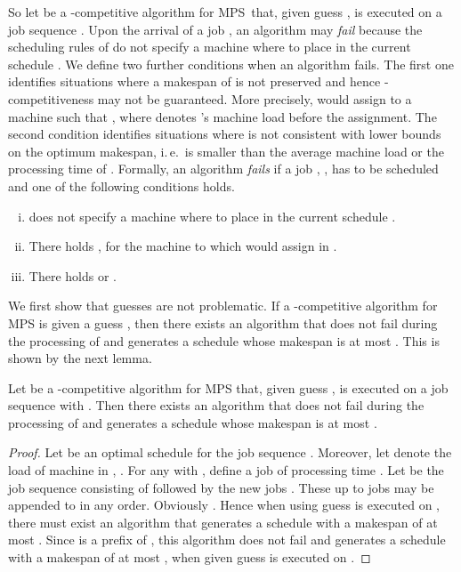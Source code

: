\documentclass{llncs}
\newcommand{\MPSO}{{\rm MPS}}
\begin{document}
So let  be a -competitive algorithm for \MPSO\ that, given guess 
, is executed on a job sequence . Upon the arrival of a job , an algorithm
 may {\em fail\/}  because the scheduling rules of  do not specify a machine where 
to place  in the current schedule . We define two further conditions when an algorithm 
fails. The first one identifies situations where a makespan of  is not preserved and hence
-competitiveness may not be guaranteed. More precisely,  would assign  to a machine  such 
that , where  denotes 's machine load before the assignment.
The second condition identifies situations where  is not consistent with lower bounds on the
optimum makespan, i.\,e.\  is smaller than the average machine load or the processing time
of . Formally, an algorithm  {\em fails\/} if a job , , has to be
scheduled and one of the following conditions holds.
\begin{enumerate}[(i)] 
 \item  does not specify a machine where to place  in the current schedule .
 \item There holds , for the machine  to which  would assign  
      in .
 \item There holds  or .
\end{enumerate}

We first show that guesses  are not problematic. If a -competitive 
algorithm  for MPS is given a guess , 
then there exists an algorithm  that does not fail during 
the processing of  and generates a schedule whose makespan is at most . This is shown by the next lemma.


\begin{lemma}\label{lem:guess1}
Let  be a -competitive algorithm for MPS that, given guess
, is executed on a job sequence  with . Then there exists an
algorithm  that does not fail during the processing of  and generates a schedule
whose makespan is at most .
\end{lemma}
\begin{proof}
Let  be an optimal schedule for the job sequence \linebreak . Moreover, let  
denote the load of machine  in , . For any  with , define a
job  of processing time . Let  be the job sequence consisting
of  followed by the new jobs . These up to  jobs may be appended to  in any order.
Obviously . Hence when  using guess  is executed on ,
there must exist an algorithm  that generates a schedule with a makespan of at most 
. Since  is a prefix of , this algorithm  does not fail and generates
a schedule with a makespan of at most , when  given guess  is executed on
. \hspace*{\fill}{}
\end{proof}
\end{document}
